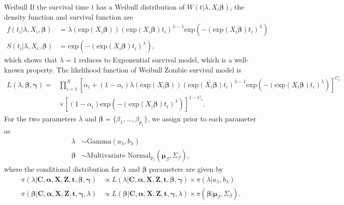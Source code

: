 \documentclass[a4paper, 12pt]{article}
\makeatletter
\renewcommand{\subsection}{\@startsection
	{subsection}    {2}    {0mm}    {-0.5\baselineskip}    {0.01\baselineskip}    {\normalfont\normalsize\itshape\center}}
\makeatother
\begin{document}
\subsection{Weibull}
\noindent 
If the survival time $t$ has a Weibull distribution of $W(t|\lambda, X_i\mathbf{\beta})$, the density function and survival function are
\begin{equation}
\begin{aligned}
f(t_i|\lambda, X_i, \mathbf{\beta}) &= \lambda(\mbox{exp}(X_i\mathbf{\beta})) (\mbox{exp}(X_i\mathbf{\beta})t_i)^{\lambda - 1} \mbox{exp}(-(\mbox{exp}(X_i\mathbf{\beta})t_i)^{\lambda})\\
S(t_i|\lambda, X_i, \mathbf{\beta}) &= \mbox{exp}(-(\mbox{exp}(X_i\mathbf{\beta})t_i)^{\lambda}),
\end{aligned}
\end{equation}
which shows that $\lambda=1$ reduces to Exponential survival model, which is a well-known property. The likelihood function of Weibull Zombie survival model is
\begin{equation}
\begin{aligned}
L(\lambda, \mathbf{\beta}, \mathbf{\gamma})=&\prod\limits_{i=1}^{N}[\alpha _{i}+(1-\alpha _{i})\lambda(\mbox{exp}(X_i\mathbf{\beta})) (\mbox{exp}(X_i\mathbf{\beta})t_i)^{\lambda - 1} \mbox{exp}(-(\mbox{exp}(X_i\mathbf{\beta})t_i)^{\lambda})]^{C_{i}}\\&\times [(1-\alpha _{i})\mbox{exp}(-(\mbox{exp}(X_i\mathbf{\beta})t_i)^{\lambda})]^{1-C_{i}}.
\end{aligned}
\end{equation}
For the two parameters $\lambda$ and $\mathbf{\beta}=\{\beta_1,...,\beta_{p_1}\}$, we assign prior to each parameter as
\begin{equation}
\begin{aligned}
\lambda &\sim \mbox{Gamma}(a_{\lambda}, b_{\lambda})\\
\mathbf{\beta} &\sim \mbox{Multivariate Normal}_{p_1}(\mathbf{\mu}_{\beta}, \Sigma_{\beta}),
\end{aligned}
\end{equation}
where the conditional distribution for $\lambda$ and $\mathbf{\beta}$ parameters are given by
\begin{equation}
\begin{aligned}
\pi(\lambda|\mathbf{C}, \mathbf{\alpha}, \mathbf{X}, \mathbf{Z}, \mathbf{t}, \mathbf{\beta}, \mathbf{\gamma}) &\propto L(\lambda|\mathbf{C}, \mathbf{\alpha}, \mathbf{X}, \mathbf{Z}, \mathbf{t}, \mathbf{\beta}, \mathbf{\gamma})\times \pi(\lambda|a_{\lambda}, b_{\lambda})\\
\pi(\mathbf{\beta}|\mathbf{C}, \mathbf{\alpha}, \mathbf{X}, \mathbf{Z}, \mathbf{t}, \mathbf{\gamma}, \lambda) &\propto L(\mathbf{\beta}|\mathbf{C}, \mathbf{\alpha}, \mathbf{X}, \mathbf{Z}, \mathbf{t}, \mathbf{\gamma}, \lambda)\times \pi(\mathbf{\beta}|\mathbf{\mu}_{\beta}, \Sigma_{\beta}).
\end{aligned}
\end{equation}
\end{document}
